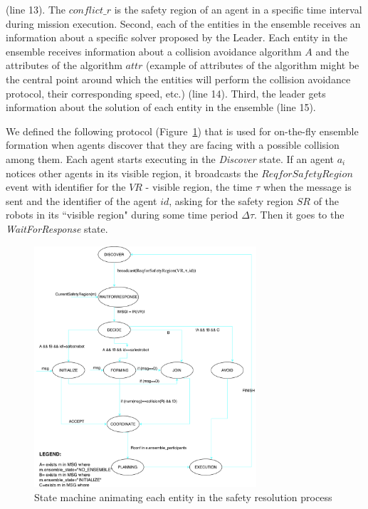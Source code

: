 \documentclass[journal]{IEEEtran}
\theoremstyle{definition}
\newcommand\patrizio[1]{\nb{Patrizio}{#1}}
\begin{document}
(line 13). The $conflict\_r$ is the safety region of an agent in a specific time interval during mission execution. Second, each of the entities in the  ensemble receives an information about a specific solver proposed by the Leader. Each entity in the ensemble receives information about a collision avoidance algorithm $A$ and the attributes of the algorithm $attr$ (example of attributes of the algorithm might be the central point around which the entities will perform the collision avoidance protocol,  their corresponding speed, etc.) (line 14).
Third, the leader gets information about the solution  of each entity in the ensemble (line 15).


We defined the following protocol (Figure~\ref{fig:STMachine}) that is used for on-the-fly ensemble formation when agents discover that they are facing with a possible collision among them. Each agent starts executing in the \textit{Discover} state. 
If an agent $a_i$ notices other agents in its visible region, it broadcasts the $ReqforSafetyRegion$ event with identifier for the $VR$ - visible  region, the time $\tau$ when the message is sent and the identifier of the agent $id$, asking for the safety region $SR$ of the robots in its ``visible region" during some time period $\Delta\tau$. Then it goes to the \textit{WaitForResponse} state.

\begin{figure}[h]
\includegraphics[width=3.25in]{Figures/SafetyResolution_FFFF.pdf}
\caption{State machine animating each entity in the safety resolution process}\label{fig:STMachine}
\end{figure}
\end{document}
